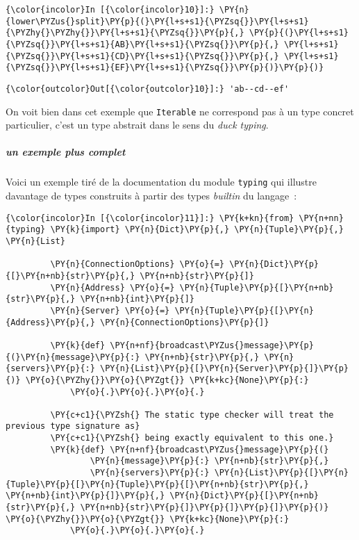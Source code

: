     \begin{Verbatim}[commandchars=\\\{\}]
{\color{incolor}In [{\color{incolor}10}]:} \PY{n}{lower\PYZus{}split}\PY{p}{(}\PY{l+s+s1}{\PYZsq{}}\PY{l+s+s1}{\PYZhy{}\PYZhy{}}\PY{l+s+s1}{\PYZsq{}}\PY{p}{,} \PY{p}{(}\PY{l+s+s1}{\PYZsq{}}\PY{l+s+s1}{AB}\PY{l+s+s1}{\PYZsq{}}\PY{p}{,} \PY{l+s+s1}{\PYZsq{}}\PY{l+s+s1}{CD}\PY{l+s+s1}{\PYZsq{}}\PY{p}{,} \PY{l+s+s1}{\PYZsq{}}\PY{l+s+s1}{EF}\PY{l+s+s1}{\PYZsq{}}\PY{p}{)}\PY{p}{)}
\end{Verbatim}


\begin{Verbatim}[commandchars=\\\{\}]
{\color{outcolor}Out[{\color{outcolor}10}]:} 'ab--cd--ef'
\end{Verbatim}
            
    On voit bien dans cet exemple que \texttt{Iterable} ne correspond pas à
un type concret particulier, c'est un type abstrait dans le sens du
\emph{duck typing}.

    \hypertarget{un-exemple-plus-complet}{%
\subparagraph{un exemple plus complet}\label{un-exemple-plus-complet}}

    Voici un exemple tiré de la documentation du module \texttt{typing} qui
illustre davantage de types construits à partir des types \emph{builtin}
du langage~:

    \begin{Verbatim}[commandchars=\\\{\}]
{\color{incolor}In [{\color{incolor}11}]:} \PY{k+kn}{from} \PY{n+nn}{typing} \PY{k}{import} \PY{n}{Dict}\PY{p}{,} \PY{n}{Tuple}\PY{p}{,} \PY{n}{List}
         
         \PY{n}{ConnectionOptions} \PY{o}{=} \PY{n}{Dict}\PY{p}{[}\PY{n+nb}{str}\PY{p}{,} \PY{n+nb}{str}\PY{p}{]}
         \PY{n}{Address} \PY{o}{=} \PY{n}{Tuple}\PY{p}{[}\PY{n+nb}{str}\PY{p}{,} \PY{n+nb}{int}\PY{p}{]}
         \PY{n}{Server} \PY{o}{=} \PY{n}{Tuple}\PY{p}{[}\PY{n}{Address}\PY{p}{,} \PY{n}{ConnectionOptions}\PY{p}{]}
         
         \PY{k}{def} \PY{n+nf}{broadcast\PYZus{}message}\PY{p}{(}\PY{n}{message}\PY{p}{:} \PY{n+nb}{str}\PY{p}{,} \PY{n}{servers}\PY{p}{:} \PY{n}{List}\PY{p}{[}\PY{n}{Server}\PY{p}{]}\PY{p}{)} \PY{o}{\PYZhy{}}\PY{o}{\PYZgt{}} \PY{k+kc}{None}\PY{p}{:}
             \PY{o}{.}\PY{o}{.}\PY{o}{.}
         
         \PY{c+c1}{\PYZsh{} The static type checker will treat the previous type signature as}
         \PY{c+c1}{\PYZsh{} being exactly equivalent to this one.}
         \PY{k}{def} \PY{n+nf}{broadcast\PYZus{}message}\PY{p}{(}
                 \PY{n}{message}\PY{p}{:} \PY{n+nb}{str}\PY{p}{,}
                 \PY{n}{servers}\PY{p}{:} \PY{n}{List}\PY{p}{[}\PY{n}{Tuple}\PY{p}{[}\PY{n}{Tuple}\PY{p}{[}\PY{n+nb}{str}\PY{p}{,} \PY{n+nb}{int}\PY{p}{]}\PY{p}{,} \PY{n}{Dict}\PY{p}{[}\PY{n+nb}{str}\PY{p}{,} \PY{n+nb}{str}\PY{p}{]}\PY{p}{]}\PY{p}{]}\PY{p}{)} \PY{o}{\PYZhy{}}\PY{o}{\PYZgt{}} \PY{k+kc}{None}\PY{p}{:}
             \PY{o}{.}\PY{o}{.}\PY{o}{.}
\end{Verbatim}


